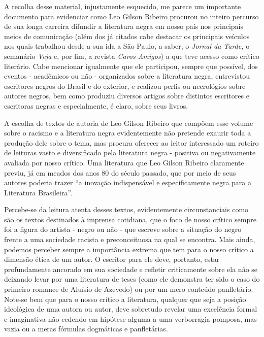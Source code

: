 \documentclass[
  letterpaper,
  DIV=11,
  numbers=noendperiod]{scrreprt}
\begin{document}
A recolha desse material, injustamente esquecido, me parece um
importante documento para evidenciar como Leo Gilson Ribeiro procurou no
inteiro percurso de sua longa carreira difundir a literatura negra em
nosso país nos principais meios de comunicação (além dos já citados cabe
destacar os principais veículos nos quais trabalhou desde a sua ida a
São Paulo, a saber, o \emph{Jornal da Tarde,} o semanário \emph{Veja} e,
por fim, a revista \emph{Caros Amigos}) a que teve acesso como crítico
literário. Cabe mencionar igualmente que ele participou, sempre que
possível, dos eventos - acadêmicos ou não - organizados sobre a
literatura negra, entrevistou escritores negros do Brasil e do exterior,
e realizou perfis ou necrológios sobre autores negros, bem como produziu
diversos artigos sobre distintos escritores e escritoras negras e
especialmente, é claro, sobre seus livros.

A escolha de textos de autoria de Leo Gilson Ribeiro que compõem esse
volume sobre o racismo e a literatura negra evidentemente não pretende
exaurir toda a produção dele sobre o tema, mas procura oferecer ao
leitor interessado um roteiro de leituras vasto e diversificado pela
literatura negra - positiva ou negativamente avaliada por nosso crítico.
Uma literatura que Leo Gilson Ribeiro claramente previu, já em meados
dos anos 80 do século passado, que por meio de seus autores poderia
trazer ``a inovação indispensável e especificamente negra para a
Literatura Brasileira''.

Percebe-se da leitura atenta desses textos, evidentemente
circunstanciais como são os textos destinados à imprensa cotidiana, que
o foco de nosso crítico sempre foi a figura do artista - negro ou não -
que escreve sobre a situação do negro frente a uma sociedade racista e
preconceituosa na qual se encontra. Mais ainda, podemos perceber sempre
a importância extrema que tem para o nosso crítico a dimensão ética de
um autor. O escritor para ele deve, portanto, estar profundamente
ancorado em sua sociedade e refletir criticamente sobre ela não se
deixando levar por uma literatura de teses (como ele demonstra ter sido
o caso do primeiro romance de Aluísio de Azevedo) ou por um mero
conteúdo panfletário. Note-se bem que para o nosso crítico a literatura,
qualquer que seja a posição ideológica de uma autora ou autor, deve
sobretudo revelar uma excelência formal e imaginativa não cedendo em
hipótese alguma a uma verborragia pomposa, mas vazia ou a meras fórmulas
dogmáticas e panfletárias.
\end{document}
